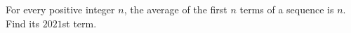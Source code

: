 For every positive integer $n$, the average of the first $n$ terms of a sequence is $n$. Find its $2021$st term.
